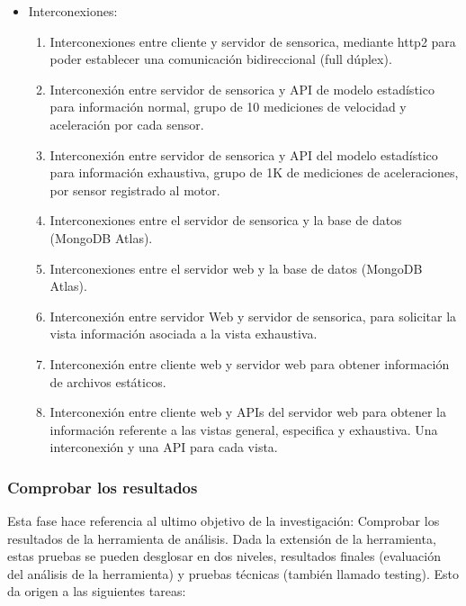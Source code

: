 \begin{itemize}
    \item Interconexiones:
        \begin{enumerate}
            \item Interconexiones entre cliente y servidor de sensorica, mediante
                http2 para poder establecer una comunicación bidireccional (full dúplex).
            \item Interconexión entre servidor de sensorica y API de modelo
                estadístico para información normal, grupo de 10
                mediciones de velocidad y aceleración por cada sensor.
            \item Interconexión entre servidor de sensorica y API del modelo
                estadístico para información exhaustiva, grupo de 1K de mediciones
                de aceleraciones, por sensor registrado al motor.
            \item Interconexiones entre el servidor de sensorica y la base de datos
                (MongoDB Atlas).
            \item Interconexiones entre el servidor web y la base de datos (MongoDB Atlas).
            \item Interconexión entre servidor Web y servidor de sensorica, para
                solicitar la vista información asociada a la vista exhaustiva.
            \item Interconexión entre cliente web y servidor web para obtener
                información de archivos estáticos.
            \item Interconexión entre cliente web y APIs del servidor web para
                obtener la información referente a las vistas general, especifica
                y exhaustiva. Una interconexión y una API para cada vista.
        \end{enumerate}
\end{itemize}


\subsubsection{Comprobar los resultados}
Esta fase hace referencia al ultimo objetivo de la investigación: Comprobar los
resultados de la herramienta de análisis. Dada la extensión de la herramienta,
estas pruebas se pueden desglosar en dos niveles, resultados finales (evaluación
del análisis de la herramienta) y pruebas técnicas (también llamado testing).
Esto da origen a las siguientes tareas:

